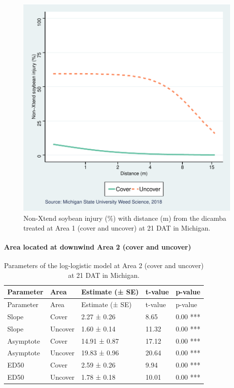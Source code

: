 \documentclass[]{article}
\let\oldparagraph\paragraph
\renewcommand{\paragraph}[1]{\oldparagraph{#1}\mbox{}}
\begin{document}
\begin{figure}
\centering
\includegraphics{Report_files/figure-latex/unnamed-chunk-50-1.pdf}
\caption{Non-Xtend soybean injury (\%) with distance (m) from the
dicamba treated at Area 1 (cover and uncover) at 21 DAT in Michigan.}
\end{figure}

\newpage

\pagebreak

\paragraph{Area located at downwind Area 2 (cover and
uncover)}\label{area-located-at-downwind-area-2-cover-and-uncover}

\begin{longtable}[]{@{}lllll@{}}
\caption{Parameters of the log-logistic model at Area 2 (cover and
uncover) at 21 DAT in Michigan.}\tabularnewline
\toprule
Parameter & Area & Estimate (± SE) & t-value & p-value\tabularnewline
\midrule
\endfirsthead
\toprule
Parameter & Area & Estimate (± SE) & t-value & p-value\tabularnewline
\midrule
\endhead
Slope & Cover & 2.27 ± 0.26 & 8.65 & 0.00 ***\tabularnewline
Slope & Uncover & 1.60 ± 0.14 & 11.32 & 0.00 ***\tabularnewline
Asymptote & Cover & 14.91 ± 0.87 & 17.12 & 0.00 ***\tabularnewline
Asymptote & Uncover & 19.83 ± 0.96 & 20.64 & 0.00 ***\tabularnewline
ED50 & Cover & 2.59 ± 0.26 & 9.94 & 0.00 ***\tabularnewline
ED50 & Uncover & 1.78 ± 0.18 & 10.01 & 0.00 ***\tabularnewline
\bottomrule
\end{longtable}
\end{document}
